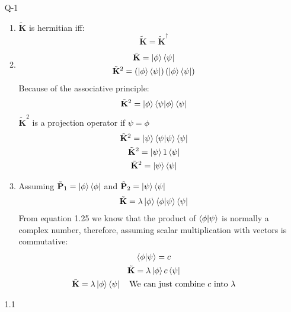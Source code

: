 \documentclass[12pt]{article}
\title{}
\author{Johannes Byle}
\newcommand{\op}[1]{\tilde{\mathbf{#1}}}
\begin{document}
    \maketitle
    \begin{enumerate}
        \item[Q-1]
        \begin{enumerate}
            \item $\op{K}$ is hermitian iff:
            \[
                \op{K}=\op{K}^{\dagger}
            \]
            \item
            \begin{gather*}
                \op{K}=\ket{\phi}\bra{\psi}\\
                \op{K}^2=\left(\ket{\phi}\bra{\psi}\right)\left(\ket{\phi}\bra{\psi}\right)
            \end{gather*}
            Because of the associative principle:
            \begin{gather*}
                \op{K}^2=\ket{\phi}\braket{\psi|\phi}\bra{\psi}
            \end{gather*}
            $\op{K}^2$ is a projection operator if $\psi=\phi$
            \begin{gather*}
                \op{K}^2=\ket{\psi}\braket{\psi|\psi}\bra{\psi}\\
                \op{K}^2=\ket{\psi}1\bra{\psi}\\
                \op{K}^2=\ket{\psi}\bra{\psi}
            \end{gather*}
            \item
            Assuming $\op{P}_1=\ket{\phi}\bra{\phi}$ and $\op{P}_2=\ket{\psi}\bra{\psi}$
            \begin{gather*}
                \op{K}=\lambda\ket{\phi}\braket{\phi|\psi}\bra{\psi}
            \end{gather*}
            From equation 1.25 we know that the product of $\braket{\phi|\psi}$ is normally a complex number, therefore, assuming scalar multiplication with vectors is commutative:
            \begin{gather*}
                \braket{\phi|\psi}=c\\
                \op{K}=\lambda\ket{\phi}c\bra{\psi}\\
                \op{K}=\lambda\ket{\phi}\bra{\psi}\quad\text{We can just combine $c$ into $\lambda$}
            \end{gather*}
        \end{enumerate}
        \item[1.1]

\end{enumerate}
\end{document}
